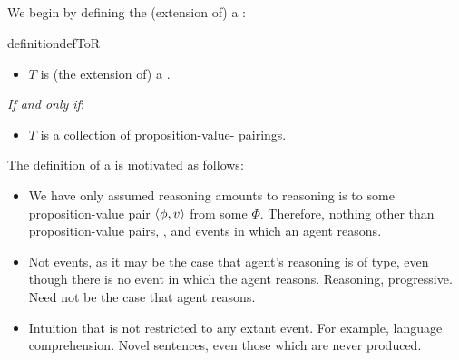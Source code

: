 \subsection{}
\label{cha:typical:sec:tR:ToRdef}

\begin{note}
  We begin by defining the (extension of) a \tor{}:

  \begin{restatable}[\tor{2}]{definition}{defToR}
    \label{def:tor}
    \mbox{ }
    \vspace{-\baselineskip}
    \begin{itemize}
    \item
      \(T\) is (the extension of) a \emph{}.
    \end{itemize}

    \emph{If and only if}:

    \begin{itemize}
    \item
      \(T\) is a collection of proposition-value-\pool{} pairings.
    \end{itemize}
    \vspace{-\baselineskip}
  \end{restatable}

  The definition of a \tor{} is motivated as follows:
  \begin{itemize}
  \item
    We have only assumed reasoning amounts to reasoning is to some proposition-value pair \(\langle \phi, v \rangle\) from some \pool{} \(\Phi\).
    Therefore, nothing other than proposition-value pairs, , and events in which an agent reasons.
  \item
    Not events, as it may be the case that agent's reasoning is of type, even though there is no event in which the agent reasons.
    Reasoning, progressive.
    Need not be the case that agent reasons.
  \item
    Intuition that \tor{} is not restricted to any extant event.
    For example, language comprehension.
    Novel sentences, even those which are never produced.
  \end{itemize}
\end{note}

